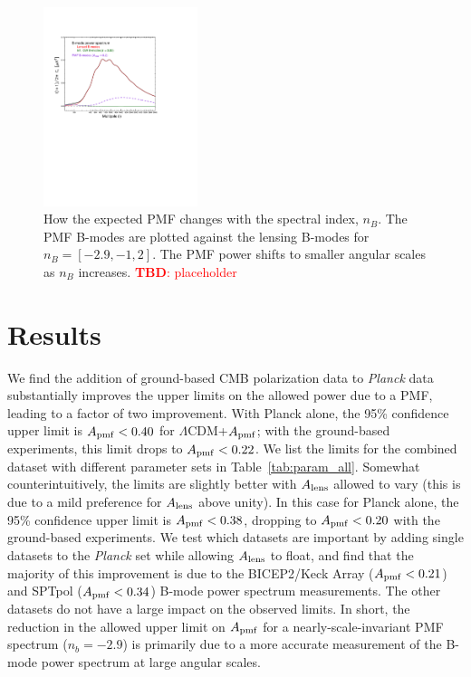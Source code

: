 \documentclass[apj]{emulateapj}
\newcommand{\apmf}{\ensuremath{A_{\rm pmf}}}
\newcommand{\alens}{\ensuremath{A_{\rm lens}}}
\newcommand{\lcdm}{\ensuremath{\Lambda}CDM}
\newcommand{\planck}{{\sl Planck}}
\newcommand{\bicepkeck}{BICEP2/Keck Array}
\newcommand{\sptpol}{SPTpol}
\newcommand{\tbd}[1]{\textcolor{Red}{{\bf TBD}: #1}}
\begin{document}
\begin{figure}[htb]\centering
\includegraphics[width=0.4\textwidth,clip,trim={1.5cm 12.cm 5cm 4cm}]{pmf_templates.pdf}
  \caption[CMB polarization from PMFs with different spectral indices]{ \label{fig:pmf-nb}
  How the expected PMF changes with the spectral index, $n_B$. 
  The PMF B-modes are plotted against the lensing B-modes for $n_B = [-2.9, -1, 2]$. 
  The PMF power shifts to smaller angular scales as $n_B$ increases. \tbd{placeholder}
  }
\end{figure}
 
\section{Results}
\label{sec:results}

We find the addition of ground-based CMB polarization data to \planck{} data substantially improves the upper limits on the allowed power due to a PMF, leading to a factor of two improvement. 
With Planck alone, the 95\% confidence upper limit is $\apmf <  \upperAplk$ for \lcdm{}+\apmf{}; with the ground-based experiments, this limit drops to $\apmf <  \upperAall$. 
We list the limits for the combined dataset  with different parameter sets in Table~\ref{tab:param_all}. 
Somewhat counterintuitively, the limits are slightly better with \alens{} allowed to vary (this is due to a mild preference for \alens{} above unity). 
In this case for  Planck alone, the 95\% confidence upper limit is $\apmf <  \upperAplkalens$, dropping to $\apmf <  \upperAallalens$ with the ground-based experiments. 
We test which datasets are important by adding single datasets to the \planck{} set while allowing \alens{} to float, and find that the majority of this improvement is due to the \bicepkeck{} ($\apmf <  \upperAbicepalens$) and \sptpol{} ($\apmf <  \upperAsptpolalens$) B-mode power spectrum measurements. 
The other datasets do not have a large impact on the observed limits. 
In short, the reduction in the allowed upper limit on \apmf{} for a nearly-scale-invariant PMF spectrum ($n_b=-2.9$) is primarily due to a more accurate measurement of the B-mode power spectrum at large angular scales. 
\end{document}
